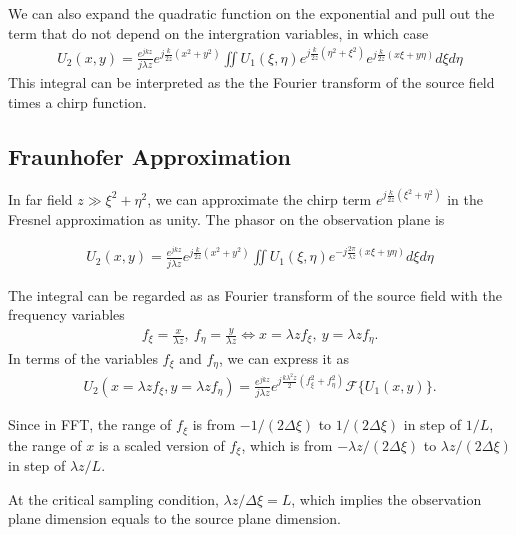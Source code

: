 \documentclass{article}
\begin{document}
We can also expand the quadratic function on the exponential and pull out the term that do not
depend on the intergration variables, in which case
\begin{align}
    U_2(x, y) = \frac{e^{jkz}}{j\lambda z} e^{j\frac{k}{2z}(x^2+y^2)} 
    \iint U_1(\xi,\eta) e^{j\frac{k}{2z}(\eta^2+\xi^2)} e^{j\frac{k}{2z}(x\xi + y\eta)} d\xi d\eta
\end{align}
This integral can be interpreted as the the Fourier transform of the source field times a chirp function.

\subsection{Fraunhofer Approximation}

In far field $z \gg \xi^2 + \eta^2$, we can approximate the chirp term $e^{j\frac{k}{2z}(\xi^2 + \eta^2)}$ 
in the Fresnel approximation as unity. The phasor on the observation plane is

\begin{align}
    U_2(x, y) = \frac{e^{jkz}}{j\lambda z} e^{j\frac{k}{2z}(x^2+y^2)} 
    \iint U_1(\xi,\eta) e^{-j\frac{2\pi}{\lambda z}(x\xi + y\eta)}d\xi d\eta
\end{align}

The integral can be regarded as as Fourier transform of the source field with the frequency variables
\begin{align}
    f_\xi = \frac{x}{\lambda z}, \ f_\eta = \frac{y}{\lambda z} \iff
    x = \lambda z f_\xi, \ y = \lambda z f_\eta.
\end{align}
In terms of the variables $f_\xi$ and $f_\eta$, we can express it as
\begin{align}
    \boxed{ U_2(x=\lambda zf_\xi, y=\lambda zf_\eta) = 
    \frac{e^{jkz}}{j\lambda z} e^{j\frac{k\lambda^2z}{2}(f_\xi^2+f_\eta^2)}
    \mathcal{F}\{U_1(x, y)\}. }
\end{align}

Since in FFT, the range of $f_\xi$ is from $-1/(2\Delta\xi)$ to $1/(2\Delta\xi)$ in step of $1/L$,
the range of $x$ is a scaled version of $f_\xi$, which is from $-\lambda z / (2\Delta\xi)$ to 
$\lambda z / (2\Delta \xi)$ in step of $\lambda z/L$.

At the critical sampling condition, $\lambda z/\Delta \xi = L$, which implies the observation plane
dimension equals to the source plane dimension.
\end{document}
